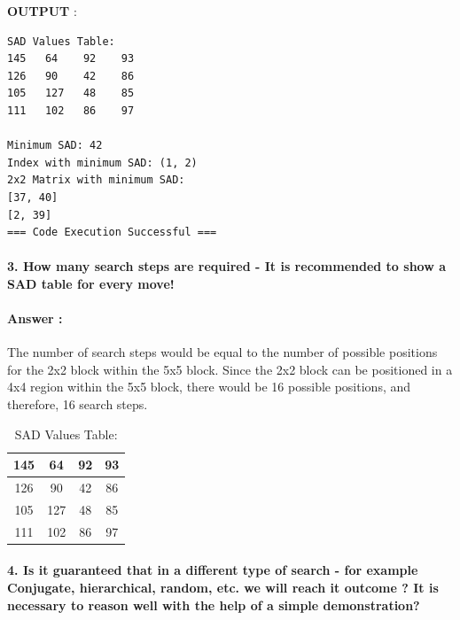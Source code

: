 \documentclass[letterpaper, 12pt]{article}
\begin{document}
\textbf{OUTPUT} :
\begin{lstlisting}
SAD Values Table:
145   64    92    93    
126   90    42    86    
105   127   48    85    
111   102   86    97    

Minimum SAD: 42
Index with minimum SAD: (1, 2)
2x2 Matrix with minimum SAD:
[37, 40]
[2, 39]
=== Code Execution Successful ===

\end{lstlisting}
\paragraph{3. How many search steps are required - It is recommended to show a SAD table for every move!}
\paragraph{Answer :} The number of search steps would be equal to the number of possible positions for the 2x2 block within the 5x5 block. Since the 2x2 block can be positioned in a 4x4 region within the 5x5 block, there would be 16 possible positions, and therefore, 16 search steps.

\begin{table}[htbp]
    \centering
        \caption{SAD Values Table:}

    \begin{tabular}{|c|c|c|c|} \hline 
         145&  64&  92& 93\\ \hline 
         126&  90&  42& 86\\ \hline 
         105&  127&  48& 85\\ \hline 
         111&  102&  86& 97\\ \hline
    \end{tabular}
\end{table}


\paragraph{4. Is it guaranteed that in a different type of search - for example Conjugate, hierarchical, random, etc. we will reach it outcome ? It is necessary to reason well with the help of a simple demonstration?}
\end{document}

